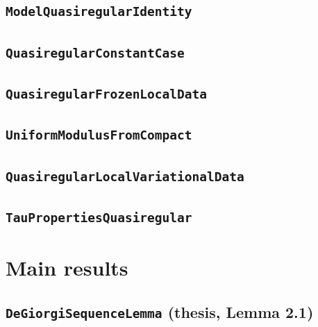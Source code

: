 \documentclass[11pt]{amsart}
\theoremstyle{definition}
\begin{document}
\subsection{\texorpdfstring{\texttt{ModelQuasiregularIdentity}}{ModelQuasiregularIdentity}}\label{node:ModelQuasiregularIdentity}


\subsection{\texorpdfstring{\texttt{QuasiregularConstantCase}}{QuasiregularConstantCase}}\label{node:QuasiregularConstantCase}


\subsection{\texorpdfstring{\texttt{QuasiregularFrozenLocalData}}{QuasiregularFrozenLocalData}}\label{node:QuasiregularFrozenLocalData}


\subsection{\texorpdfstring{\texttt{UniformModulusFromCompact}}{UniformModulusFromCompact}}\label{node:UniformModulusFromCompact}


\subsection{\texorpdfstring{\texttt{QuasiregularLocalVariationalData}}{QuasiregularLocalVariationalData}}\label{node:QuasiregularLocalVariationalData}


\subsection{\texorpdfstring{\texttt{TauPropertiesQuasiregular}}{TauPropertiesQuasiregular}}\label{node:TauPropertiesQuasiregular}


\section{Main results}\label{sec:main}
\subsection{\texorpdfstring{\texttt{DeGiorgiSequenceLemma} (thesis, Lemma 2.1)}{DeGiorgiSequenceLemma}}\label{node:DeGiorgiSequenceLemma}

\end{document}

